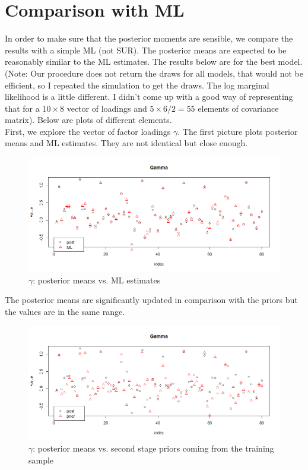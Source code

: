 \documentclass[12pt]{article}
\begin{document}
\section{Comparison with ML}
In order to make sure that the posterior moments are sensible, we compare the results with a simple ML (not SUR). The posterior means are expected to be reasonably similar to the ML estimates. The results below are for the best model. \\
(Note: Our procedure does not return the draws for all models, that would not be efficient, so I repeated the simulation to get the draws. The log marginal likelihood is a little different. I didn't come up with a good way of representing that for a $10 \times 8$ vector of loadings and $5 \times 6 / 2 = 55$ elements of covariance matrix). Below are plots of different elements.\\
First, we explore the vector of factor loadings $\gamma$. The first picture plots posterior means and ML estimates. They are not identical but close enough. 
\begin{figure}[!h]
	\centering
	\includegraphics[width=15cm]{Pics/SanityCheckGamma.png}
	\caption{$\gamma$: posterior means vs. ML estimates}
\end{figure}
The posterior means are significantly updated in comparison with the priors but the values are in the same range.
\begin{figure}[!h]
	\centering
	\includegraphics[width=15cm]{Pics/SanityCheckGammaPrior.png}
	\caption{$\gamma$: posterior means vs. second stage priors coming from the training sample}
\end{figure}
\end{document}
